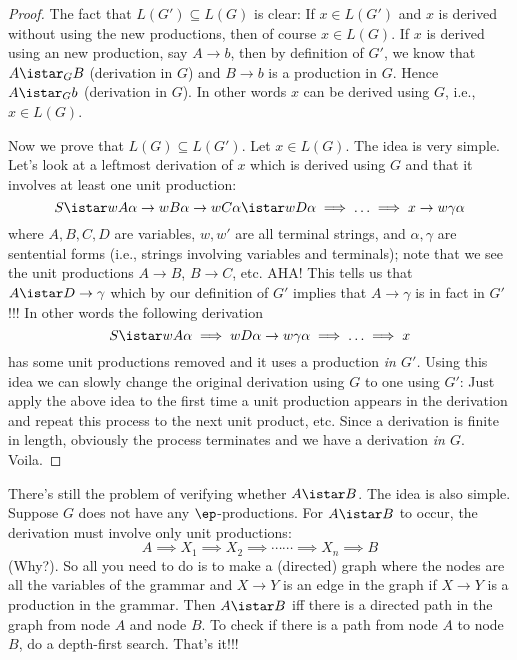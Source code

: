 \begin{proof}
The fact that $L(G') \subseteq L(G)$ is clear: If $x \in L(G')$
and $x$ is derived without using the new productions, then of
course $x \in L(G)$. If $x$ is derived using an new production,
say $A \rightarrow b$, then by definition of $G'$, we know that $A
\istar_G B$ (derivation in $G$) and $B \rightarrow b$ is a
production in $G$. Hence $A \istar_G b$ (derivation in $G$). In
other words $x$ can be derived using $G$, i.e., $x \in L(G)$.

Now we prove that $L(G) \subseteq L(G')$. Let $x \in L(G)$. The
idea is very simple. Let's look at a leftmost derivation of $x$
which is derived using $G$ and that it involves at least one unit
production:
\[
 S \istar w A \alpha \rightarrow wB \alpha \rightarrow wC \alpha \istar
 wD\alpha \implies \ldots \implies x
 \rightarrow w\gamma\alpha
\]
where $A, B, C, D$ are variables, $w,w'$ are all terminal strings,
and $\alpha, \gamma$ are sentential forms (i.e., strings involving
variables and terminals); note that we see the unit productions $A
\rightarrow B$, $B \rightarrow C$, etc. AHA! This tells us that $A
\istar D \rightarrow \gamma$ which by our definition of $G'$
implies that $A \rightarrow \gamma$ is in fact in $G'$!!! In other
words the following derivation
\[
 S \istar w A \alpha \implies wD\alpha \rightarrow w\gamma
 \alpha \implies \ldots \implies x
\]
has some unit productions removed and it uses a production
\textit{ in
$G'$.} Using this idea we can slowly change the original
derivation using $G$ to one using $G'$: Just apply the above idea
to the first time a unit production appears in the derivation and
repeat this process to the next unit product, etc. Since a
derivation is finite in length, obviously the process terminates
and we have a derivation \textit{ in $G$}. Voila.

\end{proof}

There's still the problem of verifying whether $A \istar B$. The
idea is also simple. Suppose $G$ does not have any
$\ep$-productions. For $A \istar B$ to occur, the derivation must
involve only unit productions:
\[
 A \implies X_1 \implies X_2 \implies \cdots \cdots \implies X_n
 \implies B
\]
(Why?). So all you need to do is to make a (directed) graph where
the nodes are all the variables of the grammar and $X \rightarrow
Y$ is an edge in the graph if $X \rightarrow Y$ is a production in
the grammar. Then $A \istar B$ iff there is a directed path in the
graph from node $A$ and node $B$. To check if there is a path from
node $A$ to node $B$, do a depth-first search. That's it!!!

